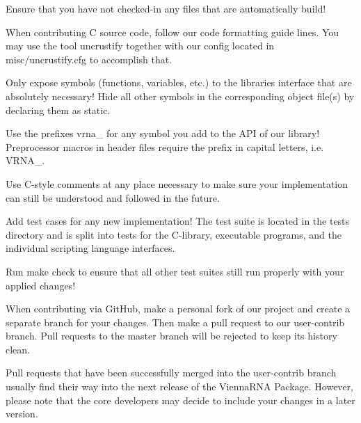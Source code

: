 \begin{DoxyEnumerate}
\item Ensure that you have not checked-\/in any files that are automatically build!
\item When contributing C source code, follow our code formatting guide lines. You may use the tool {\ttfamily uncrustify} together with our config located in {\ttfamily misc/uncrustify.\+cfg} to accomplish that.
\item Only expose symbols (functions, variables, etc.) to the libraries interface that are absolutely necessary! Hide all other symbols in the corresponding object file(s) by declaring them as {\ttfamily static}.
\item Use the prefixes {\ttfamily vrna\+\_\+} for any symbol you add to the A\+PI of our library! Preprocessor macros in header files require the prefix in capital letters, i.\+e. {\ttfamily V\+R\+N\+A\+\_\+}.
\item Use C-\/style comments at any place necessary to make sure your implementation can still be understood and followed in the future.
\item Add test cases for any new implementation! The test suite is located in the {\ttfamily tests} directory and is split into tests for the C-\/library, executable programs, and the individual scripting language interfaces.
\item Run {\ttfamily make check} to ensure that all other test suites still run properly with your applied changes!
\item When contributing via Git\+Hub, make a personal fork of our project and create a separate branch for your changes. Then make a pull request to our {\ttfamily user-\/contrib} branch. Pull requests to the {\ttfamily master} branch will be rejected to keep its history clean.
\item Pull requests that have been successfully merged into the {\ttfamily user-\/contrib} branch usually find their way into the next release of the Vienna\+R\+NA Package. However, please note that the core developers may decide to include your changes in a later version. 
\end{DoxyEnumerate}